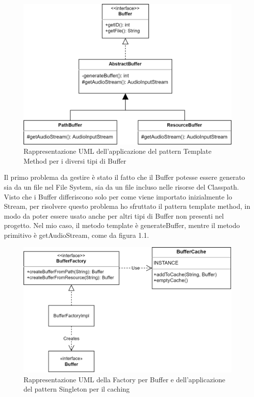 \documentclass[a4paper,12pt]{report}
\begin{document}
\begin{figure}[H]
\centering{}
\includegraphics[width=\textwidth]{img/Buffer.png}
\caption{Rappresentazione UML dell’applicazione del pattern Template Method per i diversi tipi di Buffer}
\label{img:templatebuffer}
\end{figure}
Il primo problema da gestire è stato il fatto che il Buffer potesse essere generato sia da un file nel File System, sia da un file incluso nelle risorse del Classpath. Visto che i Buffer differiscono solo per come viene importato inizialmente lo Stream, per risolvere questo problema ho sfruttato il pattern template method, in modo da poter essere usato anche per altri tipi di Buffer non presenti nel progetto. Nel mio caso, il metodo template è generateBuffer, mentre il metodo primitivo è getAudioStream, come da figura 1.1.
%
\begin{figure}[H]
\centering{}
\includegraphics[width=\textwidth]{img/BufferImport.png}
\caption{Rappresentazione UML della Factory per Buffer e dell’applicazione del pattern Singleton per il caching}
\label{img:cachebuffer}
\end{figure}
\end{document}
